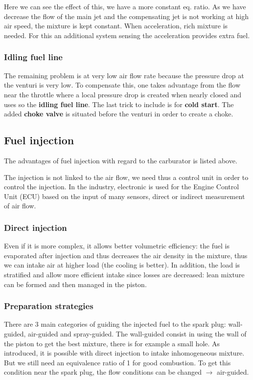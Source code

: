 	\ \\\\
	
	Here we can see the effect of this, we have a more constant eq. ratio. As we have decrease the flow of the main jet and the compensating jet is not working at high air speed, the mixture is kept constant. When acceleration, rich mixture is needed. For this an additional system sensing the acceleration provides extra fuel. 
	
\subsubsection{Idling fuel line}
	The remaining problem is at very low air flow rate because the pressure drop at the venturi is very low. To compensate this, one takes advantage from the flow near the throttle where a local pressure drop is created when nearly closed and uses so the \textbf{idling fuel line}.  The last trick to include is for \textbf{cold start}. The added \textbf{choke valve} is situated before the venturi in order to create a choke. 
	
\subsection{Fuel injection}
	The advantages of fuel injection with regard to the carburator is listed above. 
	
	The injection is not linked to the air flow, we need thus a control unit in order to control the injection. In the industry, electronic is used for the Engine Control Unit (ECU) based on the input of many sensors, direct or indirect measurement of air flow. 
	
\subsubsection{Direct injection}
	Even if it is more complex, it allows better volumetric efficiency: the fuel is evaporated after injection and thus decreases the air density in the mixture, thus we can intake air at higher load (the cooling is better). In addition, the load is stratified and allow more efficient intake since losses are decreased: lean mixture can be formed and then managed in the piston. 
	
\subsubsection{Preparation strategies}
	There are 3 main categories of guiding the injected fuel to the spark plug: wall-guided, air-guided and spray-guided. The wall-guided consist in using the wall of the piston to get the best mixture, there is for example a small hole. As introduced, it is possible with direct injection to intake inhomogeneous mixture. But we still need an equivalence ratio of 1 for good combustion. To get this condition near the spark plug, the flow conditions can be changed $\rightarrow$ air-guided. 
	
